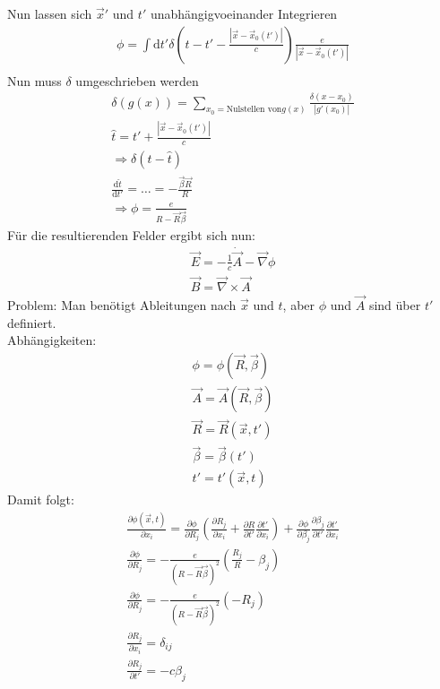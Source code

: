 \documentclass[a4paper]{article}
\begin{document}
Nun lassen sich $\vec{x}'$ und $t'$ unabhängigvoeinander Integrieren
\begin{align}
\phi=\int \mathrm{d}t' \delta\left(t-t'-\frac{|\vec{x}-\vec{x}_0(t')|}{c}\right)
\frac{e}{|\vec{x}-\vec{x}_0(t')|}\\
\end{align}
Nun muss $\delta$ umgeschrieben werden
\begin{align}
\delta(g(x))=\sum_{x_0=\text{Nulstellen von
}g(x)}\frac{\delta(x-x_0)}{|g'(x_0)|}\\
\hat{t}=t'+\frac{|\vec{x}-\vec{x}_0(t')|}{c}\\
\Rightarrow \delta(t-\hat{t})\\
\frac{\mathrm{d}\hat{t}}{\mathrm{d}t'}=\ldots=-\frac{\vec{\beta}\vec{R}}{R}\\
\Rightarrow \phi=\frac{e}{R-\vec{R}\vec{\beta}}
\end{align}
Für die resultierenden Felder ergibt sich nun:
\begin{align}
\vec{E}=-\frac{1}{c}\dot{\vec{A}}-\vec{\nabla}\phi\\
\vec{B}=\vec{\nabla}\times\vec{A}
\end{align}
Problem: Man benötigt Ableitungen nach $\vec{x}$ und $t$, aber $\phi$ und
$\vec{A}$ sind über $t'$ definiert.\\
Abhängigkeiten:
\begin{align}
\phi=\phi(\vec{R},\vec{\beta})\\
\vec{A}=\vec{A}(\vec{R},\vec{\beta})\\
\vec{R}=\vec{R}(\vec{x},t')\\
\vec{\beta}=\vec{\beta}(t')\\
t'=t'(\vec{x},t)
\end{align}
Damit folgt:
\begin{align}
\frac{\partial \phi(\vec{x},t)}{\partial x_i}=\frac{\partial \phi}{\partial
R_j}\left( \frac{\partial R_j}{\partial x_i} +\frac{\partial R}{\partial
t'} \frac{\partial t'}{\partial x_i}\right)+\frac{\partial \phi}{\partial
\beta_j}\frac{\partial \beta_j}{\partial t'}\frac{\partial t'}{\partial x_i}\\
\frac{\partial \phi}{\partial
R_j}=-\frac{e}{(R-\vec{R}\vec{\beta})^2}(\frac{R_j}{R}-\beta_j)\\
\frac{\partial \phi}{\partial
R_j}=-\frac{e}{(R-\vec{R}\vec{\beta})^2}(-R_j)\\
\frac{\partial R_j}{\partial x_i}=\delta_{ij}\\
\frac{\partial R_j}{\partial t'}=-c\beta_j\\
\end{align}
\end{document}
